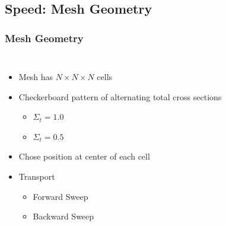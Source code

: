 \documentclass[color={usenames, dvipsnames},ignorenonframetext]{beamer}
\begin{document}
\subsection{Speed: Mesh Geometry}
\begin{frame}
\frametitle{Mesh Geometry}
\begin{columns}[c]
  \begin{itemize}
      \item Mesh has $N\times N \times N$ cells
      \item Checkerboard pattern of alternating total cross sections
          \begin{itemize}
              \item $\Sigma_t = 1.0$
              \item $\Sigma_t = 0.5$
          \end{itemize}
      \item Chose position at center of each cell
      \item Transport
      \begin{itemize}
          \item<2-> Forward Sweep
          \item<4-> Backward Sweep
          \end{itemize}
  \end{itemize}

\end{columns}
\end{frame}
\end{document}
